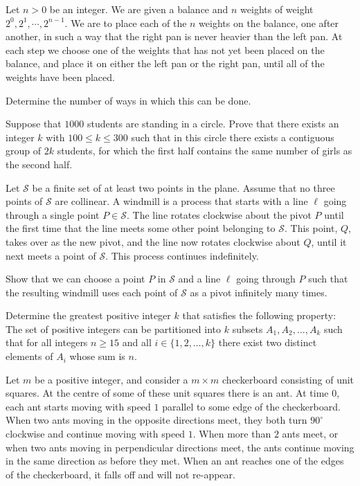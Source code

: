 \item[\textbf{C1.}]
Let 
$n > 0$
 be an integer. We are given a balance and 
$n$
 weights of weight 
$2^0, 2^1, \cdots, 2^{n-1}$.
 We are to place each of the 
$n$
 weights on the balance, one after another, in such a way that the right pan is never heavier than the left pan. At each step we choose one of the weights that has not yet been placed on the balance, and place it on either the left pan or the right pan, until all of the weights have been placed.


Determine the number of ways in which this can be done.

\item[\textbf{C2.}]
Suppose that 
$1000$
 students are standing in a circle. Prove that there exists an integer 
$k$
 with 
$100 \leq k \leq 300$
 such that in this circle there exists a contiguous group of 
$2k$
 students, for which the first half contains the same number of girls as the second half.

\item[\textbf{C3.}]
Let 
$\mathcal{S}$
 be a finite set of at least two points in the plane. Assume that no three points of 
$\mathcal S$
 are collinear. A 
windmill
 is a process that starts with a line 
$\ell$
 going through a single point 
$P \in \mathcal S$.
 The line rotates clockwise about the 
pivot
$P$
 until the first time that the line meets some other point belonging to 
$\mathcal S$.
 This point, 
$Q$, 
 takes over as the new pivot, and the line now rotates clockwise about 
$Q$, 
 until it next meets a point of 
$\mathcal S$.
 This process continues indefinitely.


Show that we can choose a point 
$P$
 in 
$\mathcal S$
 and a line 
$\ell$
 going through 
$P$
 such that the resulting windmill uses each point of 
$\mathcal S$
 as a pivot infinitely many times.

\item[\textbf{C4.}]
Determine the greatest positive integer 
$k$
 that satisfies the following property: The set of positive integers can be partitioned into 
$k$
 subsets 
$A_1, A_2, \ldots, A_k$
 such that for all integers 
$n \geq 15$
 and all 
$i \in \{1, 2, \ldots, k\}$
 there exist two distinct elements of 
$A_i$
 whose sum is 
$n.$

\item[\textbf{C5.}]
Let 
$m$
 be a positive integer, and consider a 
$m\times m$
 checkerboard consisting of unit squares. At the centre of some of these unit squares there is an ant. At time 
$0$, 
 each ant starts moving with speed 
$1$
 parallel to some edge of the checkerboard. When two ants moving in the opposite directions meet, they both turn 
$90^{\circ}$
 clockwise and continue moving with speed 
$1$.
 When more than 
$2$
 ants meet, or when two ants moving in perpendicular directions meet, the ants continue moving in the same direction as before they met. When an ant reaches one of the edges of the checkerboard, it falls off and will not re-appear.


